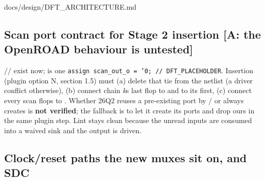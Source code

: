 \begin{relocated}{docs/design/DFT_ARCHITECTURE.md}
\subsection{Scan port contract for Stage 2 insertion {[}A: the
OpenROAD behaviour is untested{]}}\label{tm:ch:dft-architecture:144-scan-port-contract-for-stage-2-insertion-a-the-openroad-behaviour-is-untested}

// exist now;
 is one
\texttt{assign\ scan\_\allowbreak{}out\_\allowbreak{}o\ =\allowbreak{}\ '0;\ /\allowbreak{}/\allowbreak{}\ DFT\_\allowbreak{}PLACEHOLDER}.
Insertion (plugin option N, section 1.5) must (a) delete that tie from
the netlist (a driver conflict otherwise), (b) connect chain
\emph{k}\textquotesingle s last flop to  and
 to its first, (c) connect every scan
flop\textquotesingle s  to . Whether 26Q2
 reuses a pre-existing port by
/ or always
creates  is \textbf{not verified}; the fallback is to
let it create its ports and drop ours in the same plugin step. Lint
stays clean because the unread inputs are consumed into a waived sink
and the output is driven.

\subsection{\texorpdfstring{Clock/\allowbreak{}reset paths the new
muxes sit on, and
SDC}{Clock/reset paths the new muxes sit on, and SDC}}\label{tm:ch:dft-architecture:145-clockreset-paths-the-new-muxes-sit-on-and-sdc}


\end{relocated}
